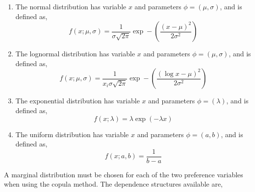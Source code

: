 \begin{enumerate}
	\item The normal distribution  has variable $x$ and parameters $\phi = (\mu,\sigma)$, and is defined as,
	\begin{equation}
	  f(x;\mu,\sigma)=\frac{1}{\sigma\sqrt{2\pi}}\exp-(\frac{(x-\mu)^2}{2\sigma^2}) 
	\end{equation}
	
	\item The lognormal distribution  has variable $x$ and parameters $\phi = (\mu,\sigma)$, and is defined as,
	\begin{equation}
	  f(x;\mu,\sigma)=\frac{1}{x_i\sigma\sqrt{2\pi}}\exp-(\frac{(\log x-\mu)^2}{2\sigma^2})
	\end{equation}
	
	\item The exponential distribution  has variable $x$ and parameters $\phi = (\lambda)$, and is defined as,
	\begin{equation}
	  f(x;\lambda)= \lambda \exp(-\lambda x)
	\end{equation}  
	
	\item The uniform distribution  has variable $x$ and parameters $\phi = (a,b)$, and is defined as,
	\begin{equation}
	  f(x;a,b)= \frac{1}{b-a}
	\end{equation}
	
\end{enumerate}

A marginal distribution must be chosen for each of the two preference variables when using the copula method. The dependence structures available are,

